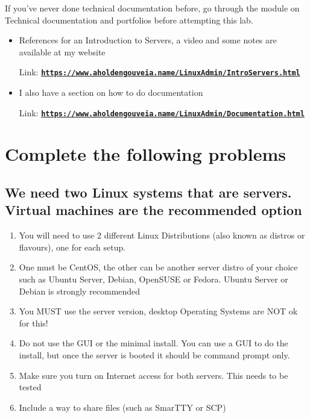 \documentclass[12pt]{article}
\begin{document}
If you've never done technical documentation before, go through the module on Technical documentation and portfolios before attempting this lab.

    \begin{itemize}
\item References for an Introduction to Servers, a video and some notes are available at my website

Link: \href{https://www.aholdengouveia.name/LinuxAdmin/IntroServers.html}{\textbf{\nolinkurl{https://www.aholdengouveia.name/LinuxAdmin/IntroServers.html}}} 


\item I also have a section on how to do documentation 

Link: \href{https://www.aholdengouveia.name/LinuxAdmin/Documentation.html}{\textbf{\nolinkurl{https://www.aholdengouveia.name/LinuxAdmin/Documentation.html}}}


\end{itemize}

\section*{Complete the following problems}

\subsection*{We need two Linux systems that are servers.  Virtual machines are the recommended option}
    \begin{enumerate}
        \item You will need to use 2 different Linux Distributions (also known as distros or flavours), one for each setup.
        \item One must be CentOS, the other can be another server distro of your choice such as Ubuntu Server, Debian, OpenSUSE or Fedora.  Ubuntu Server or Debian is strongly recommended
        \item You MUST use the server version, desktop Operating Systems  are NOT ok for this! 
        \item Do not use the GUI or the minimal install. You can use a GUI to do the install, but once the server is booted it should be command prompt only.
        \item Make sure you turn on Internet access for both servers.  This needs to be tested
        \item Include a way to share files (such as SmarTTY or SCP)


    \end{enumerate}
\end{document}
